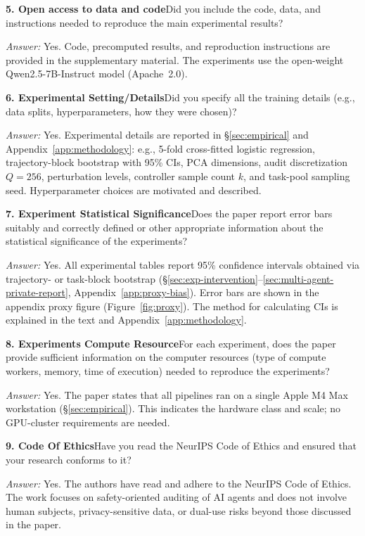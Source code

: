 \documentclass{article}
\begin{document}
  \noindent\textbf{5. Open access to data and code}\quad Did you include the
  code, data, and instructions needed to reproduce the main experimental
  results?

  \emph{Answer:} Yes. Code, precomputed results, and reproduction instructions
  are provided in the supplementary material. The experiments use the
  open-weight Qwen2.5-7B-Instruct model (Apache~2.0).

  \noindent\textbf{6. Experimental Setting/Details}\quad Did you specify all the
   training details (e.g., data splits, hyperparameters, how they were chosen)?

  \emph{Answer:} Yes. Experimental details are reported in \S\ref{sec:empirical}
   and Appendix~\ref{app:methodology}: e.g., 5-fold cross-fitted logistic
  regression, trajectory-block bootstrap with 95\% CIs, PCA dimensions, audit
  discretization $Q=256$, perturbation levels, controller sample count $k$, and
  task-pool sampling seed. Hyperparameter choices are motivated and described.

  \noindent\textbf{7. Experiment Statistical Significance}\quad Does the paper
  report error bars suitably and correctly defined or other appropriate
  information about the statistical significance of the experiments?

  \emph{Answer:} Yes. All experimental tables report 95\% confidence intervals
  obtained via trajectory- or task-block bootstrap
  (\S\ref{sec:exp-intervention}--\ref{sec:multi-agent-private-report},
  Appendix~\ref{app:proxy-bias}). Error bars are shown in the appendix proxy
  figure (Figure~\ref{fig:proxy}). The method for calculating CIs is explained
  in the text and Appendix~\ref{app:methodology}.

  \noindent\textbf{8. Experiments Compute Resource}\quad For each experiment,
  does the paper provide sufficient information on the computer resources (type
  of compute workers, memory, time of execution) needed to reproduce the
  experiments?

  \emph{Answer:} Yes. The paper states that all pipelines ran on a single Apple
  M4 Max workstation (\S\ref{sec:empirical}). This indicates the hardware class
  and scale; no GPU-cluster requirements are needed.

  \noindent\textbf{9. Code Of Ethics}\quad Have you read the NeurIPS Code of
  Ethics and ensured that your research conforms to it?

  \emph{Answer:} Yes. The authors have read and adhere to the NeurIPS Code of
  Ethics. The work focuses on safety-oriented auditing of AI agents and does not
   involve human subjects, privacy-sensitive data, or dual-use risks beyond
  those discussed in the paper.
\end{document}
